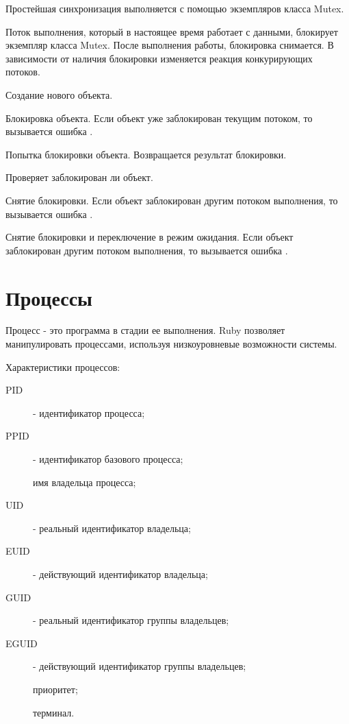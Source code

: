Простейшая синхронизация выполняется с помощью экземпляров класса Mutex.

Поток выполнения, который в настоящее время работает с данными, блокирует экземпляр класса Mutex. После выполнения работы, блокировка снимается. В зависимости от наличия блокировки изменяется реакция конкурирующих потоков.

\begin{methodlist}
  Создание нового объекта. 

  Блокировка объекта. Если объект уже заблокирован текущим потоком, то вызывается ошибка . 

  Попытка блокировки объекта. Возвращается результат блокировки.

  Проверяет заблокирован ли объект. 

  Снятие блокировки. Если объект заблокирован другим потоком выполнения, то вызывается ошибка .

  Снятие блокировки и переключение в режим ожидания. Если объект заблокирован другим потоком выполнения, то вызывается ошибка . 
\end{methodlist}

\section{Процессы}

Процесс - это программа в стадии ее выполнения. Ruby позволяет манипулировать процессами, используя низкоуровневые возможности системы.

Характеристики процессов:
\begin{description}
  \item[PID] - идентификатор процесса;
  \item[PPID] - идентификатор базового процесса;
  \item[]имя владельца процесса;
  \item[UID] - реальный идентификатор владельца;
  \item[EUID] - действующий идентификатор владельца;
  \item[GUID] - реальный идентификатор группы владельцев;
  \item[EGUID] - действующий идентификатор группы владельцев;
  \item[]приоритет;
  \item[]терминал.
\end{description}

